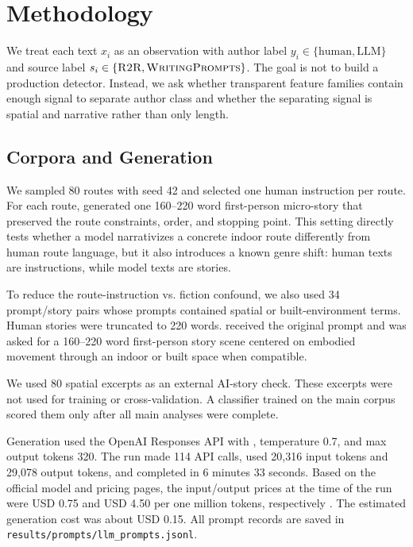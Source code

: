 \section{Methodology}
\label{sec:method}

We treat each text $x_i$ as an observation with author label $y_i \in \{\mathrm{human}, \mathrm{LLM}\}$ and source label $s_i \in \{\textsc{R2R}, \textsc{WritingPrompts}\}$. The goal is not to build a production detector. Instead, we ask whether transparent feature families contain enough signal to separate author class and whether the separating signal is spatial and narrative rather than only length.

\subsection{Corpora and Generation}
\label{sec:corpora}



We sampled 80 \rtr routes with seed 42 and selected one human instruction per route. For each route, \gptmini generated one 160--220 word first-person micro-story that preserved the route constraints, order, and stopping point. This setting directly tests whether a model narrativizes a concrete indoor route differently from human route language, but it also introduces a known genre shift: human texts are instructions, while model texts are stories.

To reduce the route-instruction vs. fiction confound, we also used 34 \writingprompts prompt/story pairs whose prompts contained spatial or built-environment terms. Human stories were truncated to 220 words. \gptmini received the original prompt and was asked for a 160--220 word first-person story scene centered on embodied movement through an indoor or built space when compatible.

We used 80 spatial \longstory excerpts as an external AI-story check. These excerpts were not used for training or cross-validation. A classifier trained on the main corpus scored them only after all main analyses were complete.

Generation used the OpenAI Responses API with \gptmini, temperature 0.7, and max output tokens 320. The run made 114 API calls, used 20,316 input tokens and 29,078 output tokens, and completed in 6 minutes 33 seconds. Based on the official \gptmini model and pricing pages, the input/output prices at the time of the run were USD 0.75 and USD 4.50 per one million tokens, respectively \cite{openai2026gpt54mini,openai2026pricing}. The estimated generation cost was about USD 0.15. All prompt records are saved in \texttt{results/prompts/llm\_prompts.jsonl}.


